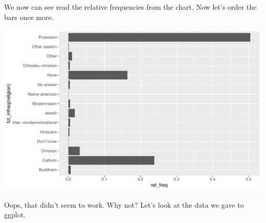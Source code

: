 \documentclass[]{tufte-book}
\newenvironment{Shaded}{}{}
\newcommand{\KeywordTok}[1]{\textcolor[rgb]{0.00,0.44,0.13}{\textbf{#1}}}
\newcommand{\DataTypeTok}[1]{\textcolor[rgb]{0.56,0.13,0.00}{#1}}
\newcommand{\StringTok}[1]{\textcolor[rgb]{0.25,0.44,0.63}{#1}}
\newcommand{\OperatorTok}[1]{\textcolor[rgb]{0.40,0.40,0.40}{#1}}
\newcommand{\NormalTok}[1]{#1}
\begin{document}
We now can see read the relative frequencies from the chart. Now let's
order the bars once more.

\begin{Shaded}
\end{Shaded}

\includegraphics{cleaning_tutorial_files/figure-latex/unnamed-chunk-83-1}

Oops, that didn't seem to work. Why not? Let's look at the data we gave
to ggplot.

\begin{Shaded}
\end{Shaded}
\end{document}
